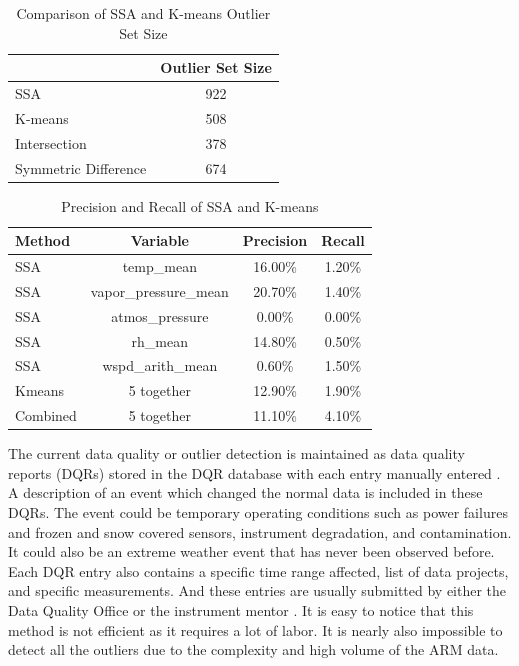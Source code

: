 \documentclass[letterpaper, 10 pt, conference]{ieeeconf}  %
\begin{document}
\begin{table}[ht]
\caption{Comparison of SSA and K-means Outlier Set Size}
\label{tab:comp}
\centering
\begin{tabular}{|l|c|}
\cline{2-2}
\multicolumn{1}{l|}{} & Outlier Set Size\\
\hline
SSA & 922\\
K-means & 508\\
Intersection & 378\\
Symmetric Difference & 674\\
\hline
\end{tabular}
\end{table}

\begin{table}[ht]
\caption{Precision and Recall of SSA and K-means}
\label{tab:pr}
\centering
\begin{tabular}{|l|c|c|c|}
\hline
Method & Variable & Precision & Recall\\
\hline
SSA & temp\_mean & 16.00\% & 1.20\%\\
SSA & vapor\_pressure\_mean & 20.70\% & 1.40\%\\
SSA & atmos\_pressure & 0.00\% & 0.00\%\\
SSA & rh\_mean & 14.80\% & 0.50\%\\
SSA & wspd\_arith\_mean & 0.60\% & 1.50\%\\
Kmeans & 5 together & 12.90\% & 1.90\%\\
Combined & 5 together & 11.10\% & 4.10\%\\
\hline
\end{tabular}
\end{table}

The current data quality or outlier detection is maintained as data quality reports (DQRs) stored in the DQR database with each entry manually entered \cite{mccord2016arm}. A description of an event which changed the normal data is included in these DQRs. The event could be temporary operating conditions such as power failures and frozen and snow covered sensors, instrument degradation, and contamination. It could also be an extreme weather event that has never been observed before. Each DQR entry also contains a specific time range affected, list of data projects, and specific measurements. And these entries are usually submitted by either the Data Quality Office \cite{peppler2016arm} or the instrument mentor \cite{cress2016deploying}. It is easy to notice that this method is not efficient as it requires a lot of labor. It is nearly also impossible to detect all the outliers due to the complexity and high volume of the ARM data.
\end{document}
